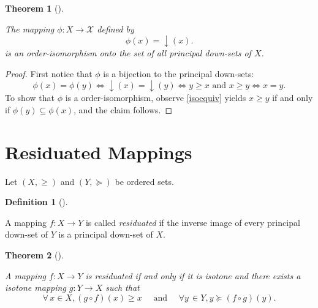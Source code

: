 \documentclass[
  letterpaper,
  10pt,
  reqno,
  twopage,
  openany]{book}
\theoremstyle{plain}
\theoremstyle{definition}
\theoremstyle{definition}
\newtheorem{definition}{Definition}[chapter]
\theoremstyle{definition}
\theoremstyle{plain}
\theoremstyle{plain}
\newtheorem{theorem}{Theorem}[chapter]
\theoremstyle{remark}
\begin{document}
\leavevmode{}%
\begin{theorem}[]\label{thm-powerset-order-isomorphism}

The mapping \(\phi: X\to \mathcal{X}\) defined by \[
\phi(x)= {\downarrow}(x).
\] is an order-isomorphism onto the set of all principal down-sets of
\(X\).

\end{theorem}

\begin{proof}

First notice that \(\phi\) is a bijection to the principal down-sets: \[
\phi(x)=\phi(y) 
\Longleftrightarrow {\downarrow}(x) = {\downarrow}(y) 
\Longleftrightarrow y\geq x \text{ and } x\geq y
\Longleftrightarrow x=y.
\] To show that \(\phi\) is a order-isomorphism, observe
\eqref{isoequiv} yields \(x\geq y\) if and only if
\(\phi(y) \subseteq \phi(x)\), and the claim follows.

\end{proof}

\hypertarget{residuated-mappings}{%
\section{Residuated Mappings}\label{residuated-mappings}}

Let \((X,\geq)\) and \((Y,\succeq)\) be ordered sets.

\leavevmode{}%
\begin{definition}[]\label{def-residuated}

A mapping \(f:X\to Y\) is called \emph{residuated} if the inverse image
of every principal down-set of \(Y\) is a principal down-set of \(X\).

\end{definition}

\leavevmode{}%
\begin{theorem}[]\label{thm-resg}

A mapping \(f:X\to Y\) is residuated if and only if it is isotone and
there exists a isotone mapping \(g:Y\to X\) such that \begin{equation}
\label{adj}
\forall \, x\in X,   (g\circ f)(x) \geq  x 
\quad \text{ and } \quad 
\forall y \, \in Y,   y\succeq (f\circ g)(y).
\end{equation}

\end{theorem}
\end{document}
